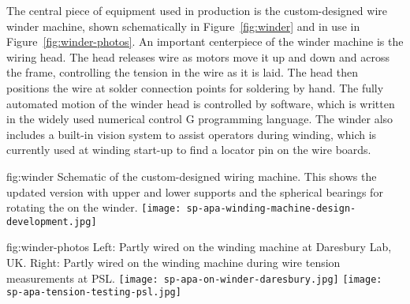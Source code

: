 The central piece of equipment used in  production is the custom-designed wire winder machine, shown schematically in Figure~\ref{fig:winder} and in use in Figure~\ref{fig:winder-photos}.  An important centerpiece of the winder machine is the wiring head.  The head releases wire as motors move it up and down and across the frame, controlling the tension in the wire as it is laid.  The head then positions the wire at solder connection points for soldering by hand. The fully automated motion of the winder head is controlled by software, which is written in the widely used numerical control G programming language.  The winder also includes a built-in vision system to assist operators during winding, which is currently used at winding start-up to find a locator pin on the wire boards.  

\begin{dunefigure}{fig:winder}
{Schematic of the custom-designed  wiring machine.  This shows the updated version with upper and lower supports and the spherical bearings for rotating the  on the winder.}
\texttt{[image: sp-apa-winding-machine-design-development.jpg]} 
\end{dunefigure}

\begin{dunefigure}{fig:winder-photos}
{Left: Partly wired   on the winding machine at Daresbury Lab, UK. Right: Partly wired   on the winding machine during wire tension measurements at PSL.}
\texttt{[image: sp-apa-on-winder-daresbury.jpg]}
\texttt{[image: sp-apa-tension-testing-psl.jpg]}
\end{dunefigure}

